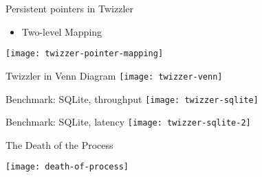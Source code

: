 \begin{frame}
    
    Persistent pointers in Twizzler    
    \begin{itemize}
        \item Two-level Mapping                        
    \end{itemize}
    \texttt{[image: twizzer-pointer-mapping]}
    
\end{frame}


\begin{frame}
    
    Twizzler in  Venn Diagram    
    \texttt{[image: twizzer-venn]}
    
\end{frame}

\begin{frame}
    
    Benchmark: SQLite, throughput       
    \texttt{[image: twizzer-sqlite]}
    
\end{frame}

\begin{frame}
    
    Benchmark: SQLite, latency       
    \texttt{[image: twizzer-sqlite-2]}
    
\end{frame}
\begin{frame}
    
    The Death of the Process
        
    \texttt{[image: death-of-process]}
    
\end{frame}

